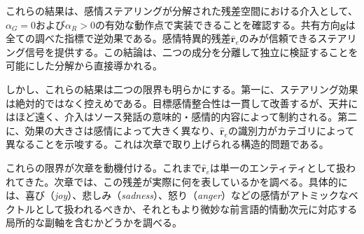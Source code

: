 これらの結果は、感情ステアリングが分解された残差空間における介入として、$\alpha_G = 0$および$\alpha_R > 0$の有効な動作点で実装できることを確認する。共有方向$\mathbf{g}$は全ての調べた指標で逆効果である。感情特異的残差$\hat{\mathbf{r}}_e$のみが信頼できるステアリング信号を提供する。この結論は、二つの成分を分離して独立に検証することを可能にした分解から直接導かれる。\par

しかし、これらの結果は二つの限界も明らかにする。第一に、ステアリング効果は絶対的ではなく控えめである。目標感情整合性は一貫して改善するが、天井にはほど遠く、介入はソース発話の意味的・感情的内容によって制約される。第二に、効果の大きさは感情によって大きく異なり、$\hat{\mathbf{r}}_e$の識別力がカテゴリによって異なることを示唆する。これは次章で取り上げられる構造的問題である。\par

これらの限界が次章を動機付ける。これまで$\hat{\mathbf{r}}_e$は単一のエンティティとして扱われてきた。次章では、この残差が実際に何を表しているかを調べる。具体的には、喜び（\textit{joy}）、悲しみ（\textit{sadness}）、怒り（\textit{anger}）などの感情がアトミックなベクトルとして扱われるべきか、それともより微妙な前言語的情動次元に対応する局所的な副軸を含むかどうかを調べる。\par
